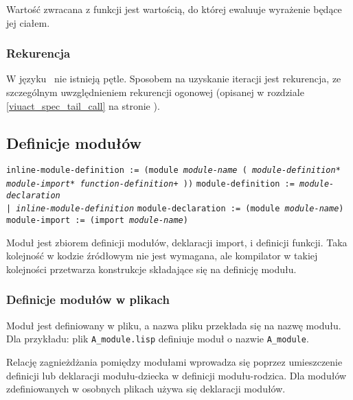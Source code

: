 Wartość zwracana z funkcji jest wartością, do której ewaluuje wyrażenie będące
jej ciałem.

\subsubsection{Rekurencja}

W języku \ViuAct\ nie istnieją pętle. Sposobem na uzyskanie iteracji jest
rekurencja, ze szczególnym uwzględnieniem rekurencji ogonowej (opisanej w
rozdziale \ref{viuact_spec_tail_call} na stronie
\pageref{viuact_spec_tail_call}).

\subsection{Definicje modułów}
\label{viuact_spec_module_definition}

\texttt{inline-module-definition := (module \emph{module-name} (
\newline
\phantom{inline-module-definition := ~}\emph{module-definition}*
\newline
\phantom{inline-module-definition := ~}\emph{module-import}*
\newline
\phantom{inline-module-definition := ~}\emph{function-definition}+
))}
\newline
\texttt{module-definition := \emph{module-declaration} \\
\phantom{module-definition :}| \emph{inline-module-definition}}
\newline
\texttt{module-declaration := (module \emph{module-name})}
\newline
\texttt{module-import := (import \emph{module-name})}
\newline

Moduł jest zbiorem definicji modułów, deklaracji import, i definicji funkcji.
Taka kolejność w kodzie źródłowym nie jest wymagana, ale kompilator w takiej
kolejności przetwarza konstrukcje składające się na definicję modułu.

\subsubsection{Definicje modułów w plikach}
\label{viuact_spec_module_definition_file}

Moduł jest definiowany w pliku, a nazwa pliku przekłada się na nazwę modułu. Dla
przykładu: plik \texttt{A\_module.lisp} definiuje moduł o nazwie
\texttt{A\_module}.

Relację zagnieżdżania pomiędzy modułami wprowadza się poprzez umieszczenie
definicji lub deklaracji modułu-dziecka w definicji modułu-rodzica. Dla modułów
zdefiniowanych w osobnych plikach używa się deklaracji modułów.

